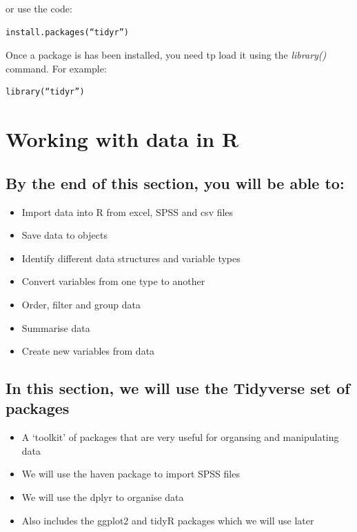 \documentclass[
]{book}
\providecommand{\tightlist}{%
  \setlength{\itemsep}{0pt}\setlength{\parskip}{0pt}}
\begin{document}
or use the code:

\begin{verbatim}
install.packages(“tidyr”)
\end{verbatim}

Once a package is has been installed, you need tp load it using the \emph{library()} command.
For example:

\begin{verbatim}
library(“tidyr”)
\end{verbatim}

\hypertarget{working-with-data-in-r}{%
\chapter{Working with data in R}\label{working-with-data-in-r}}

\hypertarget{by-the-end-of-this-section-you-will-be-able-to}{%
\section{By the end of this section, you will be able to:}\label{by-the-end-of-this-section-you-will-be-able-to}}

\begin{itemize}
\tightlist
\item
  Import data into R from excel, SPSS and csv files
\item
  Save data to objects
\item
  Identify different data structures and variable types
\item
  Convert variables from one type to another
\item
  Order, filter and group data
\item
  Summarise data
\item
  Create new variables from data
\end{itemize}

\hypertarget{in-this-section-we-will-use-the-tidyverse-set-of-packages}{%
\section{In this section, we will use the Tidyverse set of packages}\label{in-this-section-we-will-use-the-tidyverse-set-of-packages}}

\begin{itemize}
\tightlist
\item
  A `toolkit' of packages that are very useful for organsing and manipulating data
\item
  We will use the haven package to import SPSS files
\item
  We will use the dplyr to organise data
\item
  Also includes the ggplot2 and tidyR packages which we will use later
\end{itemize}
\end{document}
